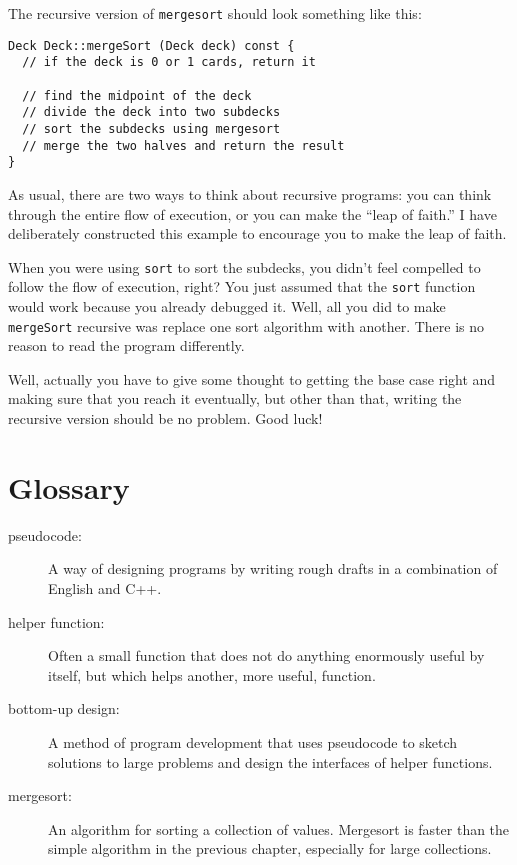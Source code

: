 The recursive version of {\tt mergesort} should look something
like this:

\begin{verbatim}
Deck Deck::mergeSort (Deck deck) const {
  // if the deck is 0 or 1 cards, return it

  // find the midpoint of the deck
  // divide the deck into two subdecks
  // sort the subdecks using mergesort
  // merge the two halves and return the result
}
\end{verbatim}
%
As usual, there are two ways to think about recursive programs:
you can think through the entire flow of execution, or you
can make the ``leap of faith.''  I have deliberately constructed
this example to encourage you to make the leap of faith.


When you were using {\tt sort} to sort the subdecks, you didn't
feel compelled to follow the flow of execution, right?  You just
assumed that the {\tt sort} function would work because you already
debugged it.  Well, all you did to make {\tt mergeSort} recursive was
replace one sort algorithm with another.  There is no reason to read
the program differently.

Well, actually you have to give some thought to getting the
base case right and making sure that you reach it eventually,
but other than that, writing the recursive version should be
no problem.  Good luck!

\section{Glossary}

\begin{description}

\item[pseudocode:]  A way of designing programs by writing
rough drafts in a combination of English and C++.

\item[helper function:]  Often a small function that does not
do anything enormously useful by itself, but which helps
another, more useful, function.

\item[bottom-up design:]  A method of program development that
uses pseudocode to sketch solutions to large problems and
design the interfaces of helper functions.

\item[mergesort:]  An algorithm for sorting a collection of
values.  Mergesort is faster than the simple algorithm in
the previous chapter, especially for large collections.



\end{description}

